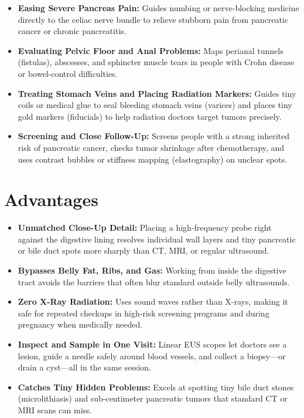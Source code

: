 \begin{itemize}
    \item \textbf{Easing Severe Pancreas Pain:} Guides numbing or nerve-blocking medicine directly to the celiac nerve bundle to relieve stubborn pain from pancreatic cancer or chronic pancreatitis.
    \item \textbf{Evaluating Pelvic Floor and Anal Problems:} Maps perianal tunnels (fistulas), abscesses, and sphincter muscle tears in people with Crohn disease or bowel-control difficulties.
    \item \textbf{Treating Stomach Veins and Placing Radiation Markers:} Guides tiny coils or medical glue to seal bleeding stomach veins (varices) and places tiny gold markers (fiducials) to help radiation doctors target tumors precisely.
    \item \textbf{Screening and Close Follow-Up:} Screens people with a strong inherited risk of pancreatic cancer, checks tumor shrinkage after chemotherapy, and uses contrast bubbles or stiffness mapping (elastography) on unclear spots.
\end{itemize}

\section{Advantages}

\begin{itemize}
    \item \textbf{Unmatched Close-Up Detail:} Placing a high-frequency probe right against the digestive lining resolves individual wall layers and tiny pancreatic or bile duct spots more sharply than CT, MRI, or regular ultrasound.
    \item \textbf{Bypasses Belly Fat, Ribs, and Gas:} Working from inside the digestive tract avoids the barriers that often blur standard outside belly ultrasounds.
    \item \textbf{Zero X-Ray Radiation:} Uses sound waves rather than X-rays, making it safe for repeated checkups in high-risk screening programs and during pregnancy when medically needed.
    \item \textbf{Inspect and Sample in One Visit:} Linear EUS scopes let doctors see a lesion, guide a needle safely around blood vessels, and collect a biopsy---or drain a cyst---all in the same session.
    \item \textbf{Catches Tiny Hidden Problems:} Excels at spotting tiny bile duct stones (microlithiasis) and sub-centimeter pancreatic tumors that standard CT or MRI scans can miss.
\end{itemize}

